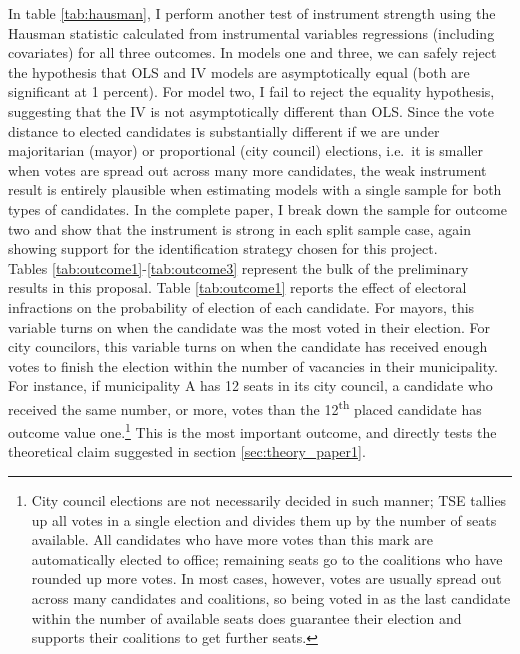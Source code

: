 \documentclass[11pt]{article}
\begin{document}
In table \ref{tab:hausman}, I perform another test of instrument strength using the Hausman statistic calculated from instrumental variables regressions (including covariates) for all three outcomes. In models one and three, we can safely reject the hypothesis that OLS and IV models are asymptotically equal (both are significant at 1 percent). For model two, I fail to reject the equality hypothesis, suggesting that the IV is not asymptotically different than OLS. Since the vote distance to elected candidates is substantially different if we are under majoritarian (mayor) or proportional (city council) elections, i.e.~it is smaller when votes are spread out across many more candidates, the weak instrument result is entirely plausible when estimating models with a single sample for both types of candidates. In the complete paper, I break down the sample for outcome two and show that the instrument is strong in each split sample case, again showing support for the identification strategy chosen for this project. \\



Tables \ref{tab:outcome1}-\ref{tab:outcome3} represent the bulk of the preliminary results in this proposal. Table \ref{tab:outcome1} reports the effect of electoral infractions on the probability of election of each candidate. For mayors, this variable turns on when the candidate was the most voted in their election. For city councilors, this variable turns on when the candidate has received enough votes to finish the election within the number of vacancies in their municipality. For instance, if municipality A has 12 seats in its city council, a candidate who received the same number, or more, votes than the 12\textsuperscript{th} placed candidate has outcome value one.\footnote{City council elections are not necessarily decided in such manner; TSE tallies up all votes in a single election and divides them up by the number of seats available. All candidates who have more votes than this mark are automatically elected to office; remaining seats go to the coalitions who have rounded up more votes. In most cases, however, votes are usually spread out across many candidates and coalitions, so being voted in as the last candidate within the number of available seats does guarantee their election and supports their coalitions to get further seats.} This is the most important outcome, and directly tests the theoretical claim suggested in section \ref{sec:theory_paper1}.

\clearpage
\end{document}
